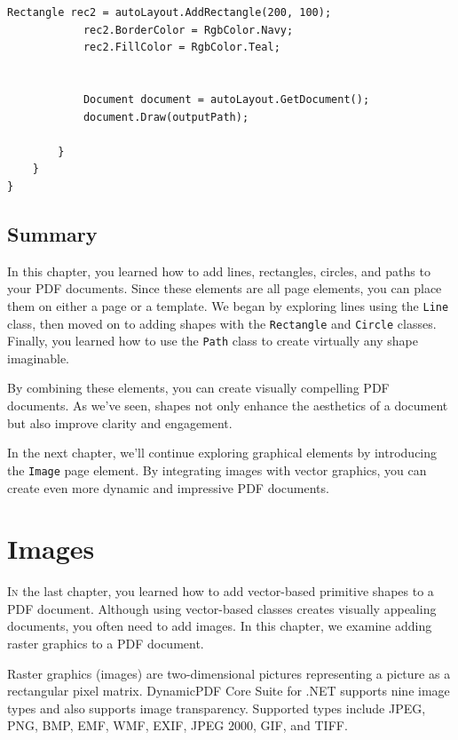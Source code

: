 \documentclass[american,letterpaper]{tufte-book}
\numberwithin{equation}{section}
\numberwithin{figure}{section}
\def\color#1{}%
\begin{document}
{{\begin{lstlisting}[caption={Using AutoLayout to create a PDF document.},label={lis:autolayout-shapes},basicstyle={\small\ttfamily},breaklines=true]
            Rectangle rec2 = autoLayout.AddRectangle(200, 100);
            rec2.BorderColor = RgbColor.Navy;
            rec2.FillColor = RgbColor.Teal;


            Document document = autoLayout.GetDocument();
            document.Draw(outputPath);

        }
    }
}
\end{lstlisting}
\leavevmode\egroup

\section{Summary}

In this chapter, you learned how to add lines, rectangles, circles, and paths to your PDF documents. Since these elements are all page elements, you can place them on either a page or a template. We began by exploring lines using the \texttt{Line} class, then moved on to adding shapes with the \texttt{Rectangle} and \texttt{Circle} classes. Finally, you learned how to use the \texttt{Path} class to create virtually any shape imaginable.

By combining these elements, you can create visually compelling PDF documents. As we’ve seen, shapes not only enhance the aesthetics of a document but also improve clarity and engagement.

In the next chapter, we’ll continue exploring graphical elements by introducing the \texttt{Image} page element. By integrating images with vector graphics, you can create even more dynamic and impressive PDF documents.

\color{white}
\chapter{Images}\label{chap:Images}
\color{black}
\BgThispage
\vspace{8.00em}
\lettrine[lines=2,lhang=0.1]{I}{n} the last chapter, you learned how to add vector-based primitive
shapes to a PDF document. Although using vector-based classes creates
visually appealing documents, you often need to add images. In this
chapter, we examine adding raster graphics to a PDF document. 

Raster graphics (images) are two-dimensional pictures representing
a picture as a rectangular pixel matrix. DynamicPDF Core Suite
for .NET supports nine image types and also supports image transparency.
Supported types include JPEG, PNG, BMP, EMF, WMF, EXIF, JPEG 2000,
GIF, and TIFF. 

}}
\end{document}

